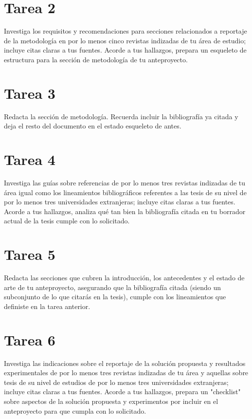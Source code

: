 \documentclass[12pt,letterpaper]{article}
\begin{document}
\section*{Tarea 2}
Investiga los requisitos y recomendaciones para secciones relacionados a reportaje de la metodología en por lo menos cinco revistas indizadas de tu área de estudio; incluye citas claras a tus fuentes. Acorde a tus hallazgos, prepara un esqueleto de estructura para la sección de metodología de tu anteproyecto.

\section*{Tarea 3}
Redacta la sección de metodología. Recuerda incluir la bibliografía ya citada y deja el resto del documento en el estado esqueleto de antes.

\section*{Tarea 4}
Investiga las guías sobre referencias de por lo menos tres revistas indizadas de tu área igual como los lineamientos bibliográficos referentes a las tesis de su nivel de por lo menos tres universidades extranjeras; incluye citas claras a tus fuentes. Acorde a tus hallazgos, analiza qué tan bien la bibliografía citada en tu borrador actual de la tesis cumple con lo solicitado.
\section*{Tarea 5}
Redacta las secciones que cubren la introducción, los antecedentes y el estado de arte de tu anteproyecto, asegurando que la bibliografía citada (siendo un subconjunto de lo que citarás en la tesis), cumple con los lineamientos que definiste en la tarea anterior.


\section*{Tarea 6}
Investiga las indicaciones sobre el reportaje de la solución propuesta y resultados experimentales de por lo menos tres revistas indizadas de tu área y aquellas sobre tesis de su nivel de estudios de por lo menos tres universidades extranjeras; incluye citas claras a tus fuentes. Acorde a tus hallazgos, prepara un "checklist" sobre aspectos de la solución propuesta y experimentos por incluir en el anteproyecto para que cumpla con lo solicitado.

\end{document}
